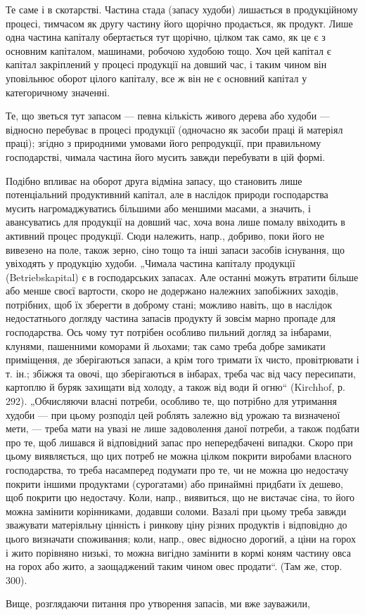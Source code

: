 Те саме і в скотарстві. Частина стада (запасу худоби) лишається в продукційному процесі, тимчасом як
другу частину його щорічно продається, як продукт. Лише одна частина капіталу обертається тут
щорічно, цілком так само, як це є з основним капіталом, машинами, робочою худобою тощо. Хоч цей
капітал є капітал закріплений у процесі продукції на довший час, і таким чином він уповільнює оборот
цілого капіталу, все ж він не є основний капітал у категоричному значенні.

Те, що зветься тут запасом — певна кількість живого дерева або худоби — відносно перебуває в процесі
продукції (одночасно як засоби праці й матеріял праці); згідно з природними умовами його
репродукції, при правильному господарстві, чимала частина його мусить завжди перебувати в цій формі.

Подібно впливає на оборот друга відміна запасу, що становить лише потенціальний продуктивний
капітал, але в наслідок природи господарства мусить нагромаджуватись більшими або меншими масами, а
значить, і авансуватись для продукції на довший час, хоча вона лише помалу ввіходить в активний
процес продукції. Сюди належить, напр., добриво, поки його не вивезено на поле, також зерно, сіно
тощо та інші запаси засобів існування, що увіходять у продукцію худоби. „Чимала частина капіталу
продукції (Betriebskapital) є в господарських запасах. Але останні можуть втратити більше або менше
своєї вартости, скоро не додержано належних запобіжних заходів, потрібних, щоб їх зберегти в доброму
стані; можливо навіть, що в наслідок недостатнього догляду частина запасів продукту й зовсім марно
пропаде для господарства. Ось чому тут потрібен особливо пильний догляд за інбарами, клунями,
пашенними коморами й льохами; так само треба добре замикати приміщення, де зберігаються запаси, а
крім того тримати їх чисто, провітрювати і т. ін.; збіжжя та овочі, що зберігаються в інбарах, треба
час від часу пересипати, картоплю й буряк захищати від холоду, а також від води й огню“ (Kirchhof,
р. 292). „Обчисляючи власні потреби, особливо те, що потрібно для утримання худоби — при цьому
розподіл цей роблять залежно від урожаю та визначеної мети, — треба мати на увазі не лише
задоволення даної потреби, а також подбати про те, щоб лишався й відповідний запас про непередбачені
випадки. Скоро при цьому виявляється, що цих потреб не можна цілком покрити виробами власного
господарства, то треба насамперед подумати про те, чи не можна цю недостачу покрити іншими
продуктами (сурогатами) або принаймні придбати їх дешево, щоб покрити цю недостачу. Коли, напр.,
виявиться, що не вистачає сіна, то його можна замінити корінниками, додавши соломи. Вазалі при цьому
треба завжди зважувати матеріяльну цінність і ринкову ціну різних продуктів і відповідно до цього
визначати споживання; коли, напр., овес відносно дорогий, а ціни на горох і жито порівняно низькі,
то можна вигідно замінити в кормі коням частину овса на горох або жито, а заощаджений таким чином
овес продати“. (Там же, стор. 300).

Вище, розглядаючи питання про утворення запасів, ми вже зауважили,
\parbreak{}  %
